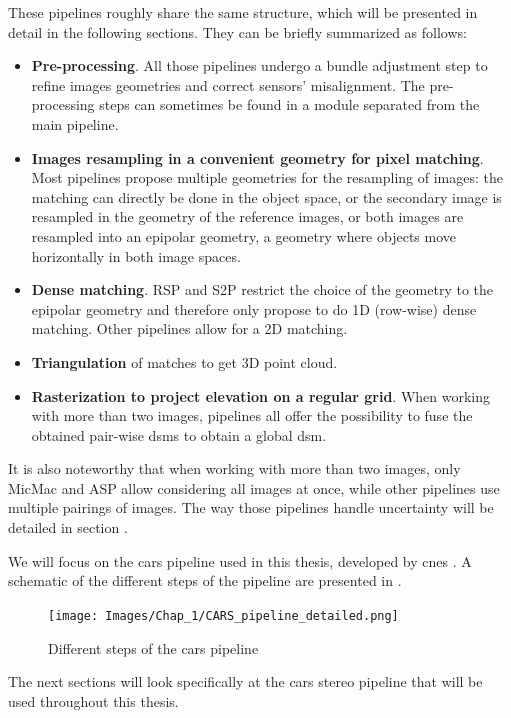 These pipelines roughly share the same structure, which will be presented in detail in the following sections. They can be briefly summarized as follows:
\begin{itemize}
    \item \textbf{Pre-processing}. All those pipelines undergo a bundle adjustment step to refine images geometries and correct sensors' misalignment. The pre-processing steps can sometimes be found in a module separated from the main pipeline.
    \item \textbf{Images resampling in a convenient geometry for pixel matching}. Most pipelines propose multiple geometries for the resampling of images: the matching can directly be done in the object space, or the secondary image is resampled in the geometry of the reference images, or both images are resampled into an epipolar geometry, \ie a geometry where objects move horizontally in both image spaces.
    \item \textbf{Dense matching}. RSP and S2P restrict the choice of the geometry to the epipolar geometry and therefore only propose to do 1D (row-wise) dense matching. Other pipelines allow for a 2D matching.
    \item \textbf{Triangulation} of matches to get 3D point cloud.
    \item \textbf{Rasterization to project elevation on a regular grid}. When working with more than two images, pipelines all offer the possibility to fuse the obtained pair-wise \acrshort{dsm}s to obtain a global \acrshort{dsm}.
\end{itemize}
It is also noteworthy that when working with more than two images, only MicMac and ASP allow considering all images at once, while other pipelines use multiple pairings of images. The way those pipelines handle uncertainty will be detailed in section .

We will focus on the \acrshort{cars} pipeline used in this thesis, developed by \acrshort{cnes} \cite{michel_new_2020}. A schematic of the different steps of the pipeline are presented in .

\begin{figure}
    \centering
    \texttt{[image: Images/Chap\_1/CARS\_pipeline\_detailed.png]}
    \caption{Different steps of the \acrshort{cars} pipeline}
    \label{fig:cars_pipeline}
\end{figure}

The next sections will look specifically at the \acrshort{cars} stereo pipeline that will be used throughout this thesis.


